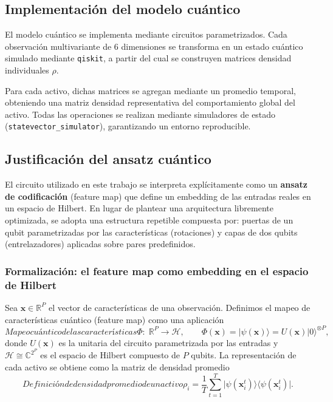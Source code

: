 \subsection{Implementación del modelo cuántico}
\label{sec:implementacion_modelo_cuantico}

El modelo cuántico se implementa mediante circuitos parametrizados. Cada observación multivariante de 6 dimensiones se transforma en un estado cuántico simulado mediante \texttt{qiskit}, a partir del cual se construyen matrices densidad individuales $\rho$.

Para cada activo, dichas matrices se agregan mediante un promedio temporal, obteniendo una matriz densidad representativa del comportamiento global del activo. Todas las operaciones se realizan mediante simuladores de estado (\texttt{statevector\_simulator}), garantizando un entorno reproducible.

\subsection{Justificación del ansatz cuántico}
\label{sec:justificacion_ansatz}

El circuito utilizado en este trabajo se interpreta explícitamente como un \textbf{ansatz de codificación} (feature map) que define un embedding de las entradas reales en un espacio de Hilbert. En lugar de plantear una arquitectura libremente optimizada, se adopta una estructura repetible compuesta por: puertas de un qubit parametrizadas por las características (rotaciones) y capas de dos qubits (entrelazadores) aplicadas sobre pares predefinidos.

\subsubsection{Formalización: el feature map como embedding en el espacio de Hilbert}

Sea $\mathbf{x}\in\mathbb{R}^P$ el vector de características de una observación. Definimos el mapeo de características cuántico (feature map) como una aplicación
\begin{equation}[eq:feature_map_cuantico]{Mapeo cuántico de las características}
\Phi:\;\mathbb{R}^P \longrightarrow \mathcal{H},
\qquad
\Phi(\mathbf{x}) = \lvert\psi(\mathbf{x})\rangle = U(\mathbf{x})\lvert 0\rangle^{\otimes P},
\end{equation}
donde $U(\mathbf{x})$ es la unitaria del circuito parametrizada por las entradas y $\mathcal{H}\cong\mathbb{C}^{2^P}$ es el espacio de Hilbert compuesto de $P$ qubits. La representación de cada activo se obtiene como la matriz de densidad promedio
\begin{equation}[eq:densidad_promedio_activo]{Definición de densidad promedio de un activo}
\rho_i = \frac{1}{T}\sum_{t=1}^T \lvert\psi(\mathbf{x}_i^t)\rangle\langle\psi(\mathbf{x}_i^t)\rvert.
\end{equation}

